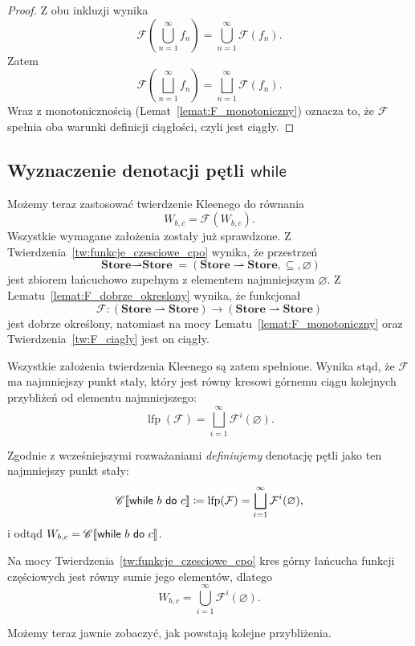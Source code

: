 \documentclass[11pt,a4paper]{article}
\theoremstyle{definition}
\theoremstyle{plain}
\newcommand{\lfp}{\operatorname{lfp}}
\DeclarePairedDelimiter{\semdelim}{\llbracket}{\rrbracket}
\newcommand{\sem}[1]{\semdelim{#1}}
\newcommand{\Cc}{\mathscr{C}}   %
\newcommand{\Store}{\textbf{Store}}
\newcommand{\kw}[1]{\ensuremath{\mathsf{#1}}} %
\begin{document}
\begin{proof}
	Z obu inkluzji wynika
	\[
	\mathcal{F}
	\left(
	\bigcup_{n=1}^{\infty}f_n
	\right)
	=
	\bigcup_{n=1}^{\infty}\mathcal{F}(f_n).
	\]
	Zatem
	\[
	\mathcal{F}
	\left(
	\bigsqcup_{n=1}^{\infty}f_n
	\right)
	=
	\bigsqcup_{n=1}^{\infty}\mathcal{F}(f_n).
	\]
	Wraz z monotonicznością (Lemat~\ref{lemat:F_monotoniczny}) oznacza to,
	że $\mathcal{F}$ spełnia oba warunki definicji ciągłości, czyli jest
	ciągły.
\end{proof}

\subsection{Wyznaczenie denotacji pętli \kw{while}}

Możemy teraz zastosować twierdzenie Kleenego do równania
\[
W_{b,c}=\mathcal{F}\left(W_{b,c}\right).
\]
Wszystkie wymagane założenia zostały już sprawdzone. Z
Twierdzenia~\ref{tw:funkcje_czesciowe_cpo} wynika, że przestrzeń
\[
\boldsymbol{\Store\rightharpoonup\Store}
=
(\Store\rightharpoonup\Store,\subseteq,\varnothing)
\]
jest zbiorem łańcuchowo zupełnym z elementem najmniejszym $\varnothing$.
Z Lematu~\ref{lemat:F_dobrze_okreslony} wynika, że funkcjonał
\[
\mathcal{F}:
(\Store\rightharpoonup\Store)
\longrightarrow
(\Store\rightharpoonup\Store)
\]
jest dobrze określony, natomiast na mocy
Lematu~\ref{lemat:F_monotoniczny} oraz
Twierdzenia~\ref{tw:F_ciagly} jest on ciągły.

Wszystkie założenia twierdzenia Kleenego są zatem spełnione. Wynika stąd,
że $\mathcal{F}$ ma najmniejszy punkt stały, który jest równy kresowi
górnemu ciągu kolejnych przybliżeń od elementu najmniejszego:
\[
\lfp(\mathcal{F})
=
\bigsqcup_{i=1}^{\infty}\mathcal{F}^i(\varnothing).
\]

Zgodnie z wcześniejszymi rozważaniami \emph{definiujemy} denotację pętli
jako ten najmniejszy punkt stały:
\[
	\Cc\sem{\kw{while}\ b\ \kw{do}\ c}
	\coloneqq
	\lfp(\mathcal{F})
	=
	\bigsqcup_{i=1}^{\infty}\mathcal{F}^i(\varnothing),
\]
i odtąd $W_{b,c}=\Cc\sem{\kw{while}\ b\ \kw{do}\ c}$.

Na mocy Twierdzenia~\ref{tw:funkcje_czesciowe_cpo} kres górny łańcucha
funkcji częściowych jest równy sumie jego elementów, dlatego
\[
	W_{b,c}
	=
	\bigcup_{i=1}^{\infty}\mathcal{F}^i(\varnothing).
\]

Możemy teraz jawnie zobaczyć, jak powstają kolejne przybliżenia.
\end{document}

